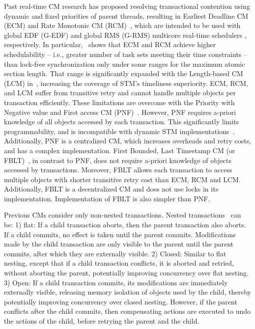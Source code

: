 \documentclass[letter]{sig-alternate}
\begin{document}
Past real-time CM research 
has proposed resolving transactional contention using dynamic and fixed priorities of parent threads, resulting in Earliest Deadline CM (ECM) and Rate Monotonic CM (RCM)~\cite{6045438,stmconcurrencycontrol:emsoft11,lcmdac2012}, which are intended to be used with global EDF (G-EDF) and global RMS (G-RMS) multicore real-time schedulers \cite{Davis:2011:SHR:1978802.1978814}, respectively.
In particular,~\cite{stmconcurrencycontrol:emsoft11} shows that ECM and RCM achieve higher schedulability -- i.e., greater number of task sets meeting their time constraints -- than lock-free synchronization only under some ranges for the maximum atomic section length. That range is significantly expanded with the Length-based CM (LCM) in~\cite{lcmdac2012}, increasing the coverage of STM's timeliness superiority. ECM, RCM, and LCM suffer from transitive retry and cannot handle multiple objects per transaction efficiently. These limitations are overcome with the Priority with Negative value and First access CM (PNF)~\cite{pnf_dac_asp,shambake_phd_proposal}. However, PNF requires a-priori knowledge of all objects accessed by each transaction. This significantly limits programmability, and is incompatible with dynamic STM implementations~\cite{Herlihy:2003:STM:872035.872048}. Additionally, PNF is a centralized CM, which increases overheads and retry costs, and has a complex implementation. First Bounded, Last Timestamp CM (or FBLT)~\cite{fblt}, in contrast to PNF, does not require a-priori knowledge of objects accessed by transactions. Moreover, FBLT allows each transaction to access multiple objects with shorter transitive retry cost than ECM, RCM and LCM. Additionally, FBLT is a decentralized CM and does not use locks in its implementation. Implementation of FBLT is also simpler than PNF.

Previous CMs consider only non-nested transactions. Nested transactions~\cite{Turcu:2012:OND:2367589.2367601,turcu2012closed} can be: 1) flat: If a child transaction aborts, then the parent transaction also aborts. If a child commits, no effect is taken until the parent commits. Modifications made by the child transaction are only visible to the parent until the parent commits, after which they are externally visible. 2) Closed: Similar to flat nesting, except that if a child transaction conflicts, it is aborted and retried, without aborting the parent, potentially improving concurrency over flat nesting. 3) Open: If a child transaction commits, its modifications are immediately externally visible, releasing memory isolation of objects used by the child, thereby potentially improving concurrency over closed nesting. However, if the parent conflicts after the child commits, then compensating actions are executed to undo the actions of the child, before retrying the parent and the child.
\end{document}
